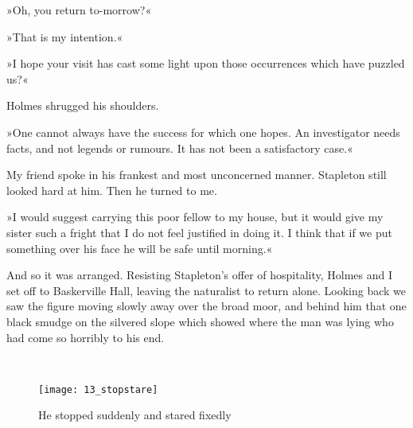 »Oh, you return to-morrow?«

»That is my intention.«

»I hope your visit has cast some light upon those occurrences which have puzzled us?«

Holmes shrugged his shoulders.

»One cannot always have the success for which one hopes. An investigator needs facts, and not legends or rumours. It has not been a satisfactory case.«

My friend spoke in his frankest and most unconcerned manner. Stapleton still looked hard at him. Then he turned to me.

»I would suggest carrying this poor fellow to my house, but it would give my sister such a fright that I do not feel justified in doing it. I think that if we put something over his face he will be safe until morning.«

And so it was arranged. Resisting Stapleton's offer of hospitality, Holmes and I set off to Baskerville Hall, leaving the naturalist to return alone. Looking back we saw the figure moving slowly away over the broad moor, and behind him that one black smudge on the silvered slope which showed where the man was lying who had come so horribly to his end.

\clearpage
~\\
\newpage
\vfill
\begin{figure}[tbph]
\centering
\texttt{[image: 13\_stopstare]}
\caption{He stopped suddenly and stared fixedly}
\end{figure}
\vfill
\thispagestyle{empty}
\clearpage
